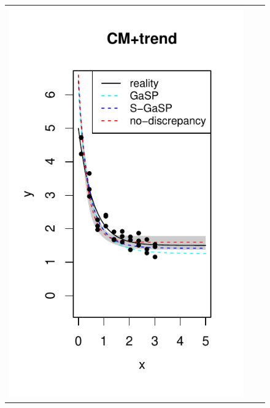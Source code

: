   \begin{figure}[t]
\centering
  \begin{tabular}{ccc}

	\hspace{-.2in} \includegraphics[scale=.7]{figures/Bayarri_2007_math_model.pdf}

\end{tabular}
\end{figure}
